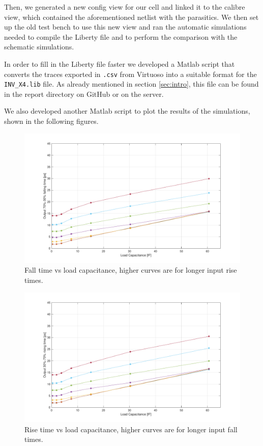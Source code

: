 \documentclass[a4paper]{article}
\begin{document}
Then, we generated a new config view for our cell and linked it to the calibre view, which contained the aforementioned netlist with the parasitics. We then set up the old test bench to use this new view and ran the automatic simulations needed to compile the Liberty file and to perform the comparison with the schematic simulations.

In order to fill in the Liberty file faster we developed a Matlab script that converts the traces exported in \texttt{.csv} from Virtuoso into a suitable format for the \texttt{INV\_X4.lib} file. As already mentioned in section \ref{sec:intro}, this file can be found in the report directory on GitHub or on the server.

We also developed another Matlab script to plot the results of the simulations, shown in the following figures.
\begin{figure}[H]
	\centering
	\includegraphics[width=\linewidth]{../INV_X4/simulations/t_F.pdf}
	\caption{Fall time vs load capacitance, higher curves are for longer input rise times.}
	\label{fig:inv_t_F}
\end{figure}
\begin{figure}[H]
	\centering
	\includegraphics[width=\linewidth]{../INV_X4/simulations/t_R.pdf}
	\caption{Rise time vs load capacitance, higher curves are for longer input fall times.}
	\label{fig:inv_t_R}
\end{figure}
\end{document}
